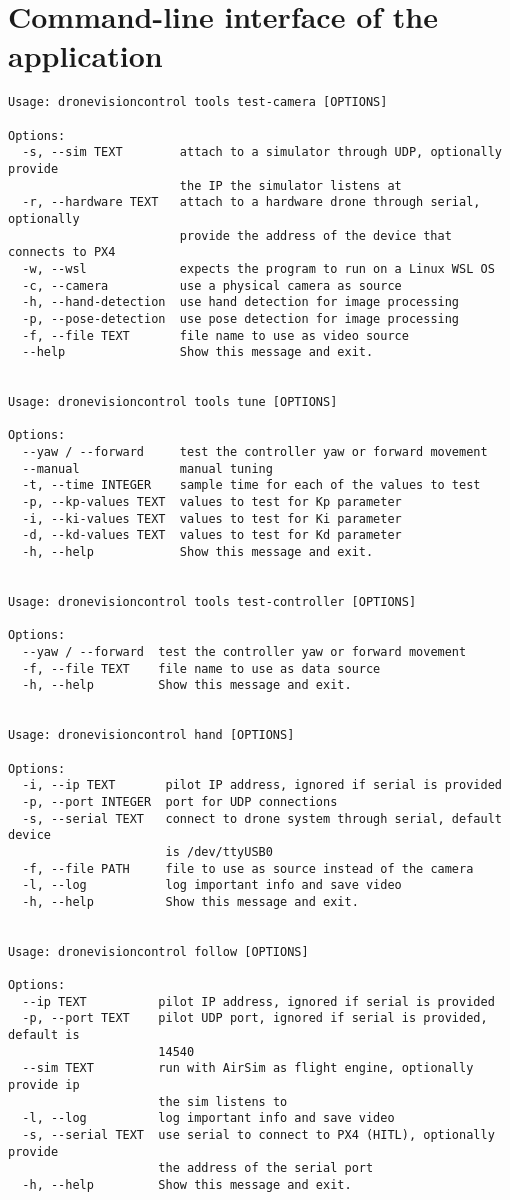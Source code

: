 \chapter{Command-line interface of the application}
\label{app:cli}

\begin{verbatim}
Usage: dronevisioncontrol tools test-camera [OPTIONS]

Options:
  -s, --sim TEXT        attach to a simulator through UDP, optionally provide
                        the IP the simulator listens at
  -r, --hardware TEXT   attach to a hardware drone through serial, optionally
                        provide the address of the device that connects to PX4
  -w, --wsl             expects the program to run on a Linux WSL OS
  -c, --camera          use a physical camera as source
  -h, --hand-detection  use hand detection for image processing
  -p, --pose-detection  use pose detection for image processing
  -f, --file TEXT       file name to use as video source
  --help                Show this message and exit.


Usage: dronevisioncontrol tools tune [OPTIONS]

Options:
  --yaw / --forward     test the controller yaw or forward movement
  --manual              manual tuning
  -t, --time INTEGER    sample time for each of the values to test
  -p, --kp-values TEXT  values to test for Kp parameter
  -i, --ki-values TEXT  values to test for Ki parameter
  -d, --kd-values TEXT  values to test for Kd parameter
  -h, --help            Show this message and exit.


Usage: dronevisioncontrol tools test-controller [OPTIONS]

Options:
  --yaw / --forward  test the controller yaw or forward movement
  -f, --file TEXT    file name to use as data source
  -h, --help         Show this message and exit.


Usage: dronevisioncontrol hand [OPTIONS]

Options:
  -i, --ip TEXT       pilot IP address, ignored if serial is provided
  -p, --port INTEGER  port for UDP connections
  -s, --serial TEXT   connect to drone system through serial, default device
                      is /dev/ttyUSB0
  -f, --file PATH     file to use as source instead of the camera
  -l, --log           log important info and save video
  -h, --help          Show this message and exit.


Usage: dronevisioncontrol follow [OPTIONS]

Options:
  --ip TEXT          pilot IP address, ignored if serial is provided
  -p, --port TEXT    pilot UDP port, ignored if serial is provided, default is
                     14540
  --sim TEXT         run with AirSim as flight engine, optionally provide ip
                     the sim listens to
  -l, --log          log important info and save video
  -s, --serial TEXT  use serial to connect to PX4 (HITL), optionally provide
                     the address of the serial port
  -h, --help         Show this message and exit.
\end{verbatim}

